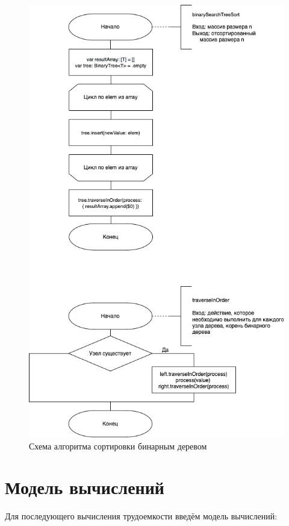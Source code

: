 \begin{figure}[h!]
	\centering
	\includegraphics[scale=0.65]{img/BinaryTree.png}
	\caption{Схема алгоритма сортировки бинарным деревом}
	\label{fig:mpr}
\end{figure}

\section{Модель вычислений}

Для последующего вычисления трудоемкости введём модель вычислений:

